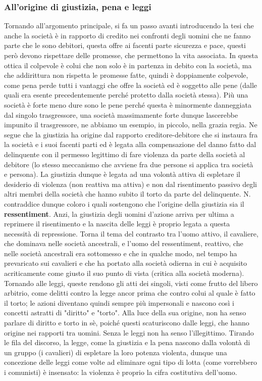 \documentclass[10pt,a4paper]{article}
\begin{document}
\subsubsection{All'origine di giustizia, pena e leggi}
Tornando all'argomento principale, si fa un passo avanti introducendo la tesi che anche la società è in rapporto di credito nei confronti degli uomini che ne fanno parte che le sono debitori, questa offre ai facenti parte sicurezza e pace, questi però devono rispettare delle promesse, che permettono la vita associata. In questa ottica il colpevole è colui che non solo è in partenza in debito con la società, ma che addirittura non rispetta le promesse fatte, quindi è doppiamente colpevole, come pena perde tutti i vantaggi che offre la società ed è soggetto alle pene (dalle quali era esente precedentemente perché protetto dalla società stessa). Più una società è forte meno dure sono le pene perché questa è minormente danneggiata dal singolo trasgressore, una società massimamente forte dunque lascerebbe impunito il trasgressore, ne abbiamo un esempio, in piccolo, nella grazia regia. Ne segue che la giustizia ha origine dal rapporto creditore-debitore che si instaura fra la società e i suoi facenti parti ed è legata alla compensazione del danno fatto dal delinquente con il permesso legittimo di fare violenza da parte della società al debitore (lo stesso meccanismo che avviene fra due persone si applica tra società e persona). La giustizia dunque è legata ad una volontà attiva di espletare il desiderio di violenza (non reattiva ma attiva) e non dal risentimento passivo degli altri membri della società che hanno subito il torto da parte del delinquente. N. contraddice dunque coloro i quali sostengono che l'origine della giustizia sia il \textbf{ressentiment}. Anzi, la giustizia degli uomini d'azione arriva per ultima a reprimere il risentimento e la nascita delle leggi è proprio legata a questa necessità di repressione. Torna il tema del contrasto tra l'uomo attivo, il cavaliere, che dominava nelle società ancestrali, e l'uomo del ressentiment, reattivo, che nelle società ancestrali era sottomesso e che in qualche modo, nel tempo ha prevaricato sui cavalieri e che ha portato alla società odierna in cui è acquisito acriticamente come giusto il suo punto di vista (critica alla società moderna). Tornando alle leggi, queste rendono gli atti dei singoli, visti come frutto del libero arbitrio, come delitti contro la legge ancor prima che contro colui al quale è fatto il torto; le azioni diventano quindi sempre più impersonali e nascono così i concetti astratti di "diritto" e "torto". Alla luce della sua origine, non ha senso parlare di diritto e torto in sè, poiché questi scaturiscono dalle leggi, che hanno origine nei rapporti tra uomini. Senza le leggi non ha senso l'illegittimo. Tirando le fila del discorso, la legge, come la giustizia e la pena nascono dalla volontà di un gruppo (i cavalieri) di espletare la loro potenza violenta, dunque una concezione delle leggi come volte ad eliminare ogni tipo di lotta (come vorrebbero i comunisti) è insensato: la violenza è proprio la cifra costitutiva dell'uomo.\\
\end{document}
